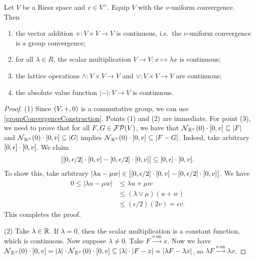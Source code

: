 \begin{proposition}
Let $V$ be a Riesz space and $v\in V^+$. Equip $V$ with the $v$-uniform convergence. Then
\begin{enumerate}
\item the vector addition $+: V\times V\to V$ is continuous, i.e.\ the $v$-uniform convergence is a group convergence;
\item for all $\lambda \in R$, the scalar multiplication $V\to V: x\mapsto \lambda x$ is continuous;
\item the lattice operations $\wedge: V\times V\to V$ and $\vee: V\times V\to V$ are continuous;
\item the absolute value function $|-|: V\to V$ is continuous.
\end{enumerate}
\end{proposition}
\begin{proof}
(1) Since $\sSet{V,+,0}$ is a commutative group, we can use \ref{groupConvergenceConstruction}. Points (1) and (2) are immediate. For point (3), we need to prove that for all $F,G\in \operatorname{\mathcal{FP}}(V)$, we have that $\neighbourhood_{\R^+}(0)\cdot \interval{0,v} \subseteq |F|$ and $\neighbourhood_{\R^+}(0)\cdot \interval{0,v} \subseteq |G|$ implies $\neighbourhood_{\R^+}(0)\cdot \interval{0,v} \subseteq |F - G|$. Indeed, take arbitrary $\interval{0,\epsilon}\cdot \interval{0,v}$. We claim
\[ \big|\interval{0,\epsilon/2}\cdot \interval{0,v} - \interval{0,\epsilon/2}\cdot \interval{0,v}\big| \subseteq \interval{0,\epsilon}\cdot \interval{0,v}. \]
To show this, take arbitrary $|\lambda u - \mu w|\in \big|\interval{0,\epsilon/2}\cdot \interval{0,v} - \interval{0,\epsilon/2}\cdot \interval{0,v}\big|$. We have
\begin{align*}
0 \leq |\lambda u - \mu w| &\leq \lambda u + \mu w \\
&\leq (\lambda \vee \mu) (u + w) \\
&\leq (\epsilon / 2) (2v) = \epsilon v.
\end{align*}
This completes the proof.

(2) Take $\lambda\in \mathbb{R}$. If $\lambda = 0$, then the scalar multiplication is a constant function, which is continuous. Now suppose $\lambda \neq 0$. Take $F\overset{\text{$v$-un}}{\longrightarrow} x$. Now we have $\neighbourhood_{\R^+}(0)\cdot \interval{0,v} = |\lambda|\cdot\neighbourhood_{\R^+}(0)\cdot \interval{0,v} \subseteq |\lambda|\cdot|F - x| = |\lambda F - \lambda x|$, so $\lambda F\overset{\text{$v$-un}}{\longrightarrow} \lambda x$.


\end{proof}
